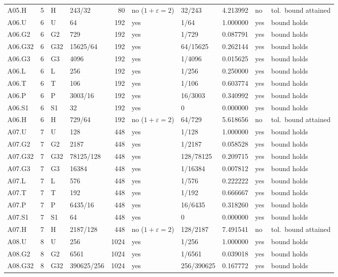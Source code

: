 {\begin{longtable}{@{}llllrlllll@{}}
A05.H & 5 & H & 243/32 & 80 & no ($1{+}\varepsilon=2$) & 32/243 & 4.213992 & no & tol.\ bound attained \\
A06.U & 6 & U & 64 & 192 & yes & 1/64 & 1.000000 & yes & bound holds \\
A06.G2 & 6 & G2 & 729 & 192 & yes & 1/729 & 0.087791 & yes & bound holds \\
A06.G32 & 6 & G32 & 15625/64 & 192 & yes & 64/15625 & 0.262144 & yes & bound holds \\
A06.G3 & 6 & G3 & 4096 & 192 & yes & 1/4096 & 0.015625 & yes & bound holds \\
A06.L & 6 & L & 256 & 192 & yes & 1/256 & 0.250000 & yes & bound holds \\
A06.T & 6 & T & 106 & 192 & yes & 1/106 & 0.603774 & yes & bound holds \\
A06.P & 6 & P & 3003/16 & 192 & yes & 16/3003 & 0.340992 & yes & bound holds \\
A06.S1 & 6 & S1 & 32 & 192 & yes & 0 & 0.000000 & yes & bound holds \\
A06.H & 6 & H & 729/64 & 192 & no ($1{+}\varepsilon=2$) & 64/729 & 5.618656 & no & tol.\ bound attained \\
A07.U & 7 & U & 128 & 448 & yes & 1/128 & 1.000000 & yes & bound holds \\
A07.G2 & 7 & G2 & 2187 & 448 & yes & 1/2187 & 0.058528 & yes & bound holds \\
A07.G32 & 7 & G32 & 78125/128 & 448 & yes & 128/78125 & 0.209715 & yes & bound holds \\
A07.G3 & 7 & G3 & 16384 & 448 & yes & 1/16384 & 0.007812 & yes & bound holds \\
A07.L & 7 & L & 576 & 448 & yes & 1/576 & 0.222222 & yes & bound holds \\
A07.T & 7 & T & 192 & 448 & yes & 1/192 & 0.666667 & yes & bound holds \\
A07.P & 7 & P & 6435/16 & 448 & yes & 16/6435 & 0.318260 & yes & bound holds \\
A07.S1 & 7 & S1 & 64 & 448 & yes & 0 & 0.000000 & yes & bound holds \\
A07.H & 7 & H & 2187/128 & 448 & no ($1{+}\varepsilon=2$) & 128/2187 & 7.491541 & no & tol.\ bound attained \\
A08.U & 8 & U & 256 & 1024 & yes & 1/256 & 1.000000 & yes & bound holds \\
A08.G2 & 8 & G2 & 6561 & 1024 & yes & 1/6561 & 0.039018 & yes & bound holds \\
A08.G32 & 8 & G32 & 390625/256 & 1024 & yes & 256/390625 & 0.167772 & yes & bound holds \\

\end{longtable}}
